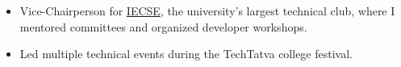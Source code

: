  

\begin{itemize}
    \item Vice-Chairperson for \href{https://iecsemanipal.com/}{IECSE}, the university's largest technical club, where I mentored committees and organized developer workshops.
    \item Led multiple technical events during the TechTatva college festival.
\end{itemize}